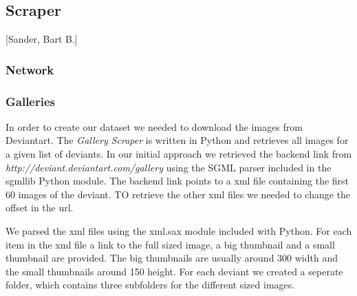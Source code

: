 \subsection{Scraper}
[Sander, Bart B.]

\subsubsection{Network}

\subsubsection{Galleries}
In order to create our dataset we needed to download the images from Deviantart. 
The \textit{Gallery Scraper} is written in Python and retrieves all images for a given 
list of deviants. In our initial approach we retrieved 
the backend link from \textit{http://deviant.deviantart.com/gallery} using the 
SGML parser included in the sgmllib Python module. The backend link points 
to a xml file containing the first 60 images of the deviant. TO retrieve the other 
xml files we needed to change the offset in the url. 

We parsed the xml files using the xml.sax module included with Python. 
For each item in the xml file a link to the full sized image, a big thumbnail and 
a small thumbnail are provided. The big thumbnails are usually around 300 width and 
the small thumbnails around 150 height. For each deviant we created a seperate folder, which
contains three subfolders for the different sized images. 

